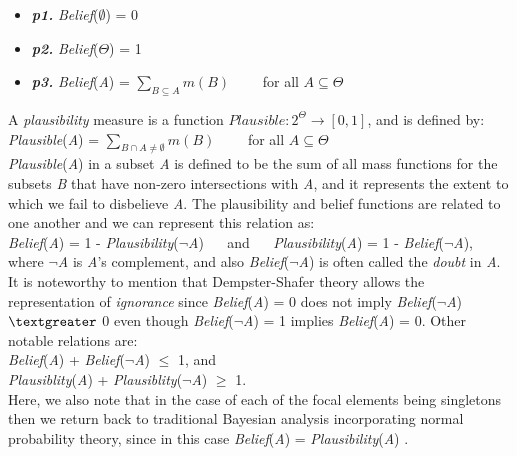\documentclass[11pt]{article}
\begin{document}
\begin{itemize}
	\item[]\textit{\textbf{p1.}} \textit{Belief}($\emptyset$) = 0
	\item[]\textit{\textbf{p2.}} \textit{Belief}($\Theta$) = 1
	\item[]\textit{\textbf{p3.}} \textit{Belief}(\textit{A}) = $\sum\limits_{B
	\subseteq A}m(B)\qquad$ for all $A \subseteq \Theta$
\end{itemize}

A \textit{plausibility} measure is a function
$Plausible:2^\Theta\rightarrow[0,1]$, and is defined by:\\

\textit{Plausible}(\textit{A}) = $\sum\limits_{B \cap A \neq
\emptyset}m(B)\qquad$ for all $A \subseteq \Theta$\\

\noindent \textit{Plausible}(\textit{A}) in a subset \textit{A} is defined to
be the sum of all mass functions for the subsets \textit{B} that have non-zero
intersections with \textit{A}, and it represents the extent to which we fail to
disbelieve \textit{A}. The plausibility and belief functions are related to one
another and we can represent this relation as:\\

\noindent\textit{Belief}(\textit{A}) = 1 -
\textit{Plausibility}(\textit{$\neg$A}) $\quad$ and $\quad$
\textit{Plausibility}(\textit{A}) = 1 - \textit{Belief}(\textit{$\neg$A}),\\

\noindent where \textit{$\neg$A} is \textit{A}'s complement, and also
\textit{Belief}(\textit{$\neg$A}) is often called the \textit{doubt} in \textit{A}.
It is noteworthy to mention that Dempster-Shafer theory allows the
representation of \textit{ignorance} since \textit{Belief}(\textit{A}) = 0 does not
imply \textit{Belief}(\textit{$\neg$A}) $\textgreater$ 0 even though
\textit{Belief}(\textit{$\neg$A}) = 1 implies \textit{Belief}(\textit{A}) = 0. Other
notable relations are:\\

\noindent\textit{Belief}(\textit{A}) + \textit{Belief}(\textit{$\neg$A}) $\leq$ 1,
and\\

\noindent\textit{Plausiblity}(\textit{A}) +
\textit{Plausiblity}(\textit{$\neg$A}) $\geq$ 1.\\

Here, we also note that in the case of each of the focal elements being
singletons then we return back to traditional Bayesian analysis incorporating
normal probability theory, since in this case \textit{Belief}(\textit{A}) =
\textit{Plausibility}(\textit{A}) \cite{beynon:dst-alternative-decision}.
\end{document}
